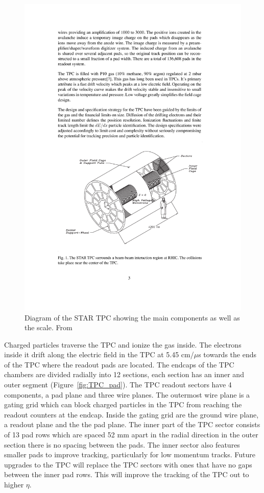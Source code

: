 \begin{figure}[htbp]
\begin{center}
\includegraphics[scale=1.0]{Plots/Detector/TPC.pdf}
\end{center}
\caption[TPC Diagram]{Diagram of the STAR TPC showing the main components as well as the scale. From~\cite{tpcNIM}}
\label{fig:TPC}
\end{figure}

Charged particles traverse the TPC and ionize the gas inside. The electrons inside it drift along the electric field in the TPC at 5.45 cm/$\mu$s towards the ends of the TPC where the readout pads are located. The endcaps of the TPC chambers are divided radially into 12 sections, each section has an inner and outer segment (Figure~\ref{fig:TPC_pad}). The TPC readout sectors have 4 components, a pad plane and three wire planes. The outermost wire plane is a gating grid which can block charged particles in the TPC from reaching the readout counters at the endcap. Inside the gating grid are the ground wire plane, a readout plane and the the pad plane. The inner part of the TPC sector consists of 13 pad rows which are spaced 52 mm apart in the radial direction in the outer section there is no spacing between the pads. The inner sector also features smaller pads to improve tracking, particularly for low momentum tracks. Future upgrades to the TPC will replace the TPC sectors with ones that have no gaps between the inner pad rows. This will improve the tracking of the TPC out to higher $\eta$. 

